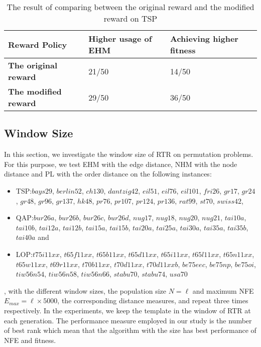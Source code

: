 \begin{table}[htbp]
    \centering
    \begin{tabular}{|l|l|l|}
    \hline
    \textbf{Reward Policy}       &\textbf{Higher usage of EHM}       & \textbf{Achieving higher fitness}  \\ \hline
    \textbf{The original reward} & 21/50 & 14/50   	 \\ \hline
    \textbf{The modified reward} & 29/50 & 36/50	\\ \hline

  
    \end{tabular} 
    \caption{The result of comparing between the original reward and the modified reward on TSP}
    \label{tb:reward}
\end{table}
\subsection{Window Size}

In this section, we investigate the window size of RTR on permutation problems. For this purpose, we test EHM with the edge distance, NHM with the node distance and PL with the order distance on the following instances:
\begin{itemize}
    \item TSP:$bays29$, $ berlin52$, $ ch130$, $ dantzig42$, $eil51$, $ eil76$, $eil101$, $ fri26$, $ gr17$, $gr24$, $ gr48$, $ gr96$, $ gr137$, $ hk48$, $ pr76$, $ pr107$, $pr124$, $ pr136$, $rat99$, $st70$, $swiss42$, 
    \item QAP:$bur26a$, $ bur26b$, $ bur26c$, $bur26d$, $ nug17$, $nug18$, $ nug20$, $ nug21$, $tai10a$, $tai10b$, $tai12a$, $tai12b$, $tai15a$, $tai15b$, $tai20a$, $tai25a$, $tai30a$, $tai35a$, $tai35b$, $tai40a$ and
    \item LOP:$t75i11xx$, $t65f11xx$, $ t65b11xx$, $ t65d11xx$, $ t65i11xx$, $t65l11xx$, $ t65n11xx$, $ t65w11xx$, $ t69r11xx$, $t70b11xx$, $ t70d11xx$, $ t70d11xxb$, $be75eec$, $ be75np$, $ be75oi$, $ tiw56n54$, $tiw56n58$, $ tiw56n66$, $stabu70$, $ stabu74$, $ usa70$
\end{itemize} 
, with the different window sizes, the population size $N=\ell$ and maximum NFE $E_{max}=\ell\times 5000$, the corresponding distance measures, and repeat three times respectively. In the experiments, we keep the template in the window of RTR at each generation. The performance measure employed in our study is the number of best rank which mean that the algorithm with the size has best performance of NFE and fitness.

